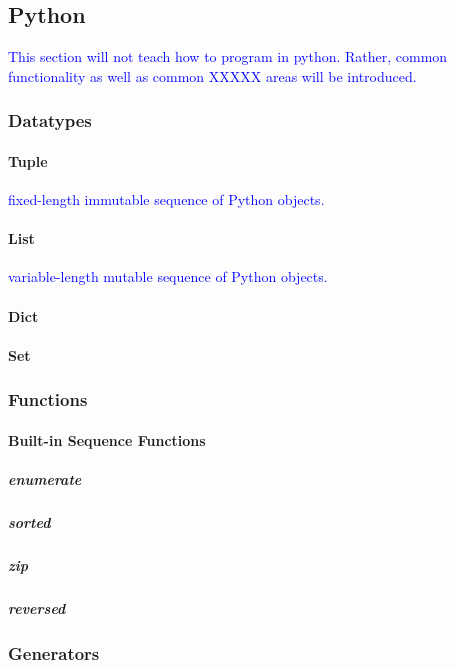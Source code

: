 \subsection{Python}

\textcolor{blue}{This section will not teach how to program in python. Rather, common functionality as well as common XXXXX areas will be introduced.}

\subsubsection{Datatypes}


\paragraph{Tuple}

\textcolor{blue}{fixed-length immutable sequence of Python objects.}

\paragraph{List}

\textcolor{blue}{variable-length mutable sequence of Python objects.}

\paragraph{Dict}

\paragraph{Set}

\subsubsection{Functions}

\paragraph{Built-in Sequence Functions}

\subparagraph{enumerate}

\subparagraph{sorted}

\subparagraph{zip}

\subparagraph{reversed}

\subsubsection{Generators}

